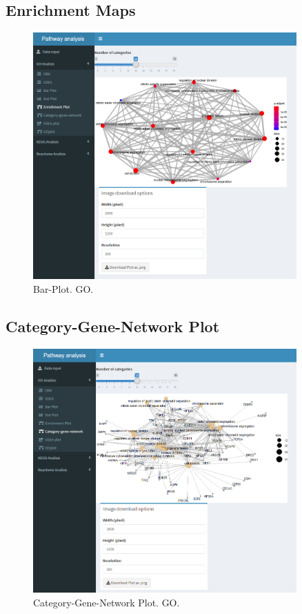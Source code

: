 \subsection{\gls{Enrichment Map}s}

\begin{figure}[H]
\centering
\includegraphics[width=0.9\textwidth]{figures/App_F16_Items_GO_Emap.png} 
\caption{\gls{Bar-Plot}. GO.}
\end{figure}

\subsection{Category-Gene-Network Plot}

\begin{figure}[H]
\centering
\includegraphics[width=0.9\textwidth]{figures/App_F17_Items_GO_CnetPlot.png} 
\caption{Category-Gene-Network Plot. GO.}
\end{figure}

